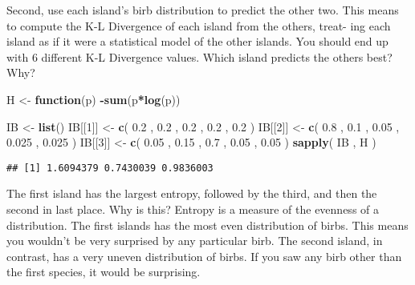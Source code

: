 \documentclass[
]{article}
\newenvironment{Shaded}{\begin{snugshade}}{\end{snugshade}}
\newcommand{\ControlFlowTok}[1]{\textcolor[rgb]{0.13,0.29,0.53}{\textbf{#1}}}
\newcommand{\DecValTok}[1]{\textcolor[rgb]{0.00,0.00,0.81}{#1}}
\newcommand{\FloatTok}[1]{\textcolor[rgb]{0.00,0.00,0.81}{#1}}
\newcommand{\KeywordTok}[1]{\textcolor[rgb]{0.13,0.29,0.53}{\textbf{#1}}}
\newcommand{\NormalTok}[1]{#1}
\newcommand{\OperatorTok}[1]{\textcolor[rgb]{0.81,0.36,0.00}{\textbf{#1}}}
\newcommand{\StringTok}[1]{\textcolor[rgb]{0.31,0.60,0.02}{#1}}
\begin{document}
Second, use each island's birb distribution to predict the other two.
This means to compute the K-L Divergence of each island from the others,
treat- ing each island as if it were a statistical model of the other
islands. You should end up with 6 different K-L Divergence values. Which
island predicts the others best? Why?

\begin{Shaded}
\begin{Highlighting}[]
\NormalTok{H <-}\StringTok{ }\ControlFlowTok{function}\NormalTok{(p) }\OperatorTok{-}\KeywordTok{sum}\NormalTok{(p}\OperatorTok{*}\KeywordTok{log}\NormalTok{(p))}

\NormalTok{IB <-}\StringTok{ }\KeywordTok{list}\NormalTok{()}
\NormalTok{IB[[}\DecValTok{1}\NormalTok{]] <-}\StringTok{ }\KeywordTok{c}\NormalTok{( }\FloatTok{0.2}\NormalTok{ , }\FloatTok{0.2}\NormalTok{ , }\FloatTok{0.2}\NormalTok{ , }\FloatTok{0.2}\NormalTok{ , }\FloatTok{0.2}\NormalTok{ )}
\NormalTok{IB[[}\DecValTok{2}\NormalTok{]] <-}\StringTok{ }\KeywordTok{c}\NormalTok{( }\FloatTok{0.8}\NormalTok{ , }\FloatTok{0.1}\NormalTok{ , }\FloatTok{0.05}\NormalTok{ , }\FloatTok{0.025}\NormalTok{ , }\FloatTok{0.025}\NormalTok{ )}
\NormalTok{IB[[}\DecValTok{3}\NormalTok{]] <-}\StringTok{ }\KeywordTok{c}\NormalTok{( }\FloatTok{0.05}\NormalTok{ , }\FloatTok{0.15}\NormalTok{ , }\FloatTok{0.7}\NormalTok{ , }\FloatTok{0.05}\NormalTok{ , }\FloatTok{0.05}\NormalTok{ )}
\KeywordTok{sapply}\NormalTok{( IB , H )}
\end{Highlighting}
\end{Shaded}

\begin{verbatim}
## [1] 1.6094379 0.7430039 0.9836003
\end{verbatim}

The first island has the largest entropy, followed by the third, and
then the second in last place. Why is this? Entropy is a measure of the
evenness of a distribution. The first islands has the most even
distribution of birbs. This means you wouldn't be very surprised by any
particular birb. The second island, in contrast, has a very uneven
distribution of birbs. If you saw any birb other than the first species,
it would be surprising.
\end{document}
